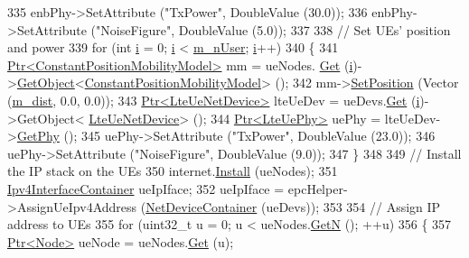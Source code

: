 \begin{DoxyCode}
335   enbPhy->SetAttribute (\textcolor{stringliteral}{"TxPower"}, DoubleValue (30.0));
336   enbPhy->SetAttribute (\textcolor{stringliteral}{"NoiseFigure"}, DoubleValue (5.0));
337 
338   \textcolor{comment}{// Set UEs' position and power}
339   \textcolor{keywordflow}{for} (\textcolor{keywordtype}{int} \hyperlink{bernuolliDistribution_8m_a6f6ccfcf58b31cb6412107d9d5281426}{i} = 0; \hyperlink{bernuolliDistribution_8m_a6f6ccfcf58b31cb6412107d9d5281426}{i} < \hyperlink{classLenaTdTbfqFfMacSchedulerTestCase1_a0b3a76f968db806b6d197452881f6cc4}{m\_nUser}; \hyperlink{bernuolliDistribution_8m_a6f6ccfcf58b31cb6412107d9d5281426}{i}++)
340     \{
341       \hyperlink{classns3_1_1Ptr}{Ptr<ConstantPositionMobilityModel>} mm = ueNodes.
      \hyperlink{classns3_1_1NodeContainer_a9ed96e2ecc22e0f5a3d4842eb9bf90bf}{Get} (\hyperlink{bernuolliDistribution_8m_a6f6ccfcf58b31cb6412107d9d5281426}{i})->\hyperlink{classns3_1_1Object_a13e18c00017096c8381eb651d5bd0783}{GetObject}<\hyperlink{classns3_1_1ConstantPositionMobilityModel}{ConstantPositionMobilityModel}> ();
342       mm->\hyperlink{classns3_1_1MobilityModel_ac584b3d5a309709d2f13ed6ada1e7640}{SetPosition} (Vector (\hyperlink{classLenaTdTbfqFfMacSchedulerTestCase1_aadf3e2ac2301fbe3c6af3423d88720fe}{m\_dist}, 0.0, 0.0));
343       \hyperlink{classns3_1_1Ptr}{Ptr<LteUeNetDevice>} lteUeDev = ueDevs.\hyperlink{classns3_1_1NetDeviceContainer_a677d62594b5c9d2dea155cc5045f4d0b}{Get} (\hyperlink{bernuolliDistribution_8m_a6f6ccfcf58b31cb6412107d9d5281426}{i})->GetObject<
      \hyperlink{classns3_1_1LteUeNetDevice}{LteUeNetDevice}> ();
344       \hyperlink{classns3_1_1Ptr}{Ptr<LteUePhy>} uePhy = lteUeDev->\hyperlink{classns3_1_1LteUeNetDevice_a2a9940a1e457a8bf3dae87fed4199c7a}{GetPhy} ();
345       uePhy->SetAttribute (\textcolor{stringliteral}{"TxPower"}, DoubleValue (23.0));
346       uePhy->SetAttribute (\textcolor{stringliteral}{"NoiseFigure"}, DoubleValue (9.0));
347     \}
348 
349   \textcolor{comment}{// Install the IP stack on the UEs}
350   internet.\hyperlink{classns3_1_1InternetStackHelper_a6645b412f31283d2d9bc3d8a95cebbc0}{Install} (ueNodes);
351   \hyperlink{classns3_1_1Ipv4InterfaceContainer}{Ipv4InterfaceContainer} ueIpIface;
352   ueIpIface = epcHelper->AssignUeIpv4Address (\hyperlink{classns3_1_1NetDeviceContainer}{NetDeviceContainer} (ueDevs));
353 
354   \textcolor{comment}{// Assign IP address to UEs}
355   \textcolor{keywordflow}{for} (uint32\_t u = 0; u < ueNodes.\hyperlink{classns3_1_1NodeContainer_aed647ac56d0407a7706aba02eb44b951}{GetN} (); ++u)
356     \{
357       \hyperlink{classns3_1_1Ptr}{Ptr<Node>} ueNode = ueNodes.\hyperlink{classns3_1_1NodeContainer_a9ed96e2ecc22e0f5a3d4842eb9bf90bf}{Get} (u);

\end{DoxyCode}
